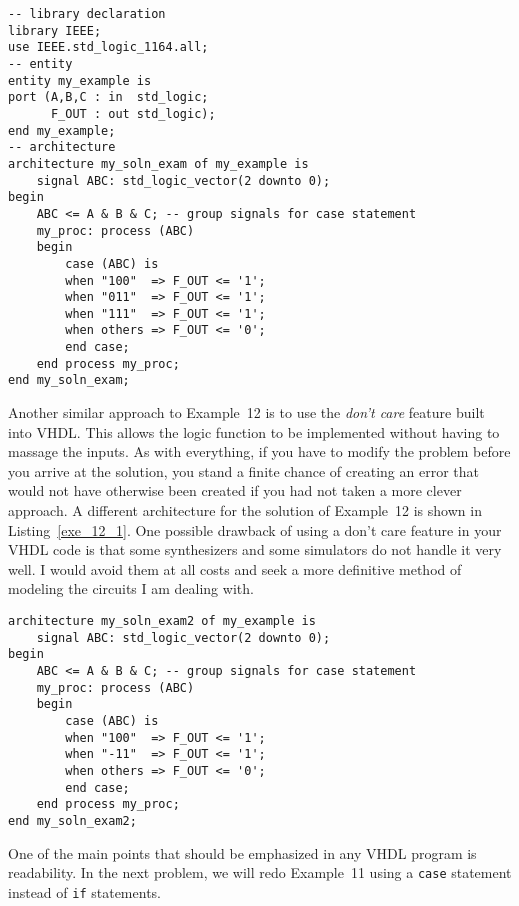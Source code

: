 \noindent
\begin{minipage}{0.99\linewidth}
\begin{lstlisting}[label=exe_12, caption=Solution to Example~12.]
-- library declaration
library IEEE;
use IEEE.std_logic_1164.all;
-- entity
entity my_example is
port (A,B,C : in  std_logic;
      F_OUT : out std_logic);
end my_example;
-- architecture
architecture my_soln_exam of my_example is
	signal ABC: std_logic_vector(2 downto 0);
begin
	ABC <= A & B & C; -- group signals for case statement
	my_proc: process (ABC)
	begin
		case (ABC) is
		when "100"  => F_OUT <= '1';
		when "011"  => F_OUT <= '1';
		when "111"  => F_OUT <= '1';
		when others => F_OUT <= '0';
		end case;
	end process my_proc;
end my_soln_exam;
\end{lstlisting}
\end{minipage}

Another similar approach to Example~12 is to use the \textit{don't care} feature built into VHDL. This allows the logic function to be implemented without having to massage the inputs. As with everything, if you have to modify the problem before you arrive at the solution, you stand a finite chance of creating an error that would not have otherwise been created if you had not taken a more clever approach. A different architecture for the solution of Example~12 is shown in Listing~\ref{exe_12_1}. One possible drawback of using a don't care feature in your VHDL code is that some synthesizers and some simulators do not handle it very well. I would avoid them at all costs and seek a more definitive method of modeling the circuits I am dealing with.

\noindent
\begin{minipage}{0.99\linewidth}
\begin{lstlisting}[label=exe_12_1, caption=Alternative solution to Example~12.]
architecture my_soln_exam2 of my_example is
	signal ABC: std_logic_vector(2 downto 0);
begin
	ABC <= A & B & C; -- group signals for case statement
	my_proc: process (ABC)
	begin
		case (ABC) is
		when "100"  => F_OUT <= '1';
		when "-11"  => F_OUT <= '1';
		when others => F_OUT <= '0';
		end case;
	end process my_proc;
end my_soln_exam2;
\end{lstlisting}
\end{minipage}

One of the main points that should be emphasized in any VHDL program is readability. In the next problem, we will redo Example~11 using a \texttt{case} statement instead of \texttt{if} statements.

